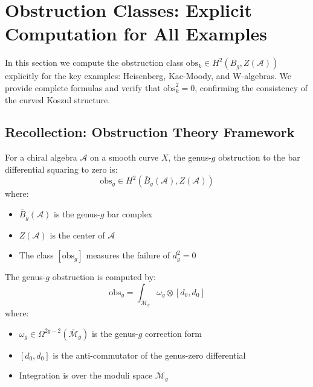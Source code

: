\section{Obstruction Classes: Explicit Computation for All Examples}
\label{sec:obstruction-explicit}

In this section we compute the obstruction class $\text{obs}_k \in H^2(B_g, Z(\mathcal{A}))$ 
explicitly for the key examples: Heisenberg, Kac-Moody, and W-algebras. We provide 
complete formulas and verify that $\text{obs}_k^2 = 0$, confirming the consistency 
of the curved Koszul structure.

\subsection{Recollection: Obstruction Theory Framework}
\label{subsec:obstruction-framework-recall}

\begin{definition}\label{def:genus-g-obstruction}
For a chiral algebra $\mathcal{A}$ on a smooth curve $X$, the genus-$g$ 
obstruction to the bar differential squaring to zero is:
$$\text{obs}_g \in H^2(\bar{B}_g(\mathcal{A}), Z(\mathcal{A}))$$
where:
\begin{itemize}
\item $\bar{B}_g(\mathcal{A})$ is the genus-$g$ bar complex
\item $Z(\mathcal{A})$ is the center of $\mathcal{A}$
\item The class $[\text{obs}_g]$ measures the failure of $d_g^2 = 0$
\end{itemize}
\end{definition}

\begin{theorem}\label{thm:obstruction-general}
The genus-$g$ obstruction is computed by:
\begin{equation}
\text{obs}_g = \int_{\overline{\mathcal{M}}_g} \omega_g \otimes [d_0, d_0]
\end{equation}
where:
\begin{itemize}
\item $\omega_g \in \Omega^{2g-2}(\overline{\mathcal{M}}_g)$ is the genus-$g$ 
correction form
\item $[d_0, d_0]$ is the anti-commutator of the genus-zero differential
\item Integration is over the moduli space $\overline{\mathcal{M}}_g$
\end{itemize}
\end{theorem}

